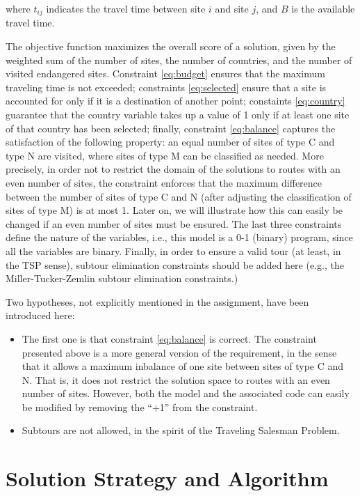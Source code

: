 \documentclass[12pt]{article}
\begin{document}
where $t_{ij}$ indicates the travel time between site $i$ and site $j$, and $B$
is the available travel time.

The objective function maximizes the overall score of a solution, given by the
weighted sum of the number of sites, the number of countries, and the number of
visited endangered sites. Constraint \eqref{eq:budget} ensures that the
maximum traveling time is not exceeded; constraints \eqref{eq:selected} ensure
that a site is accounted for only if it is a destination of another point;
constaints \eqref{eq:country} guarantee that the country variable takes up
a value of 1 only if at least one site of that country has been selected;
finally, constraint \eqref{eq:balance} captures the satisfaction of the following
property: an equal number of sites of type C and type N are visited, where
sites of type M can be classified as needed. More precisely, in order not to
restrict the domain of the solutions to routes with an even number of sites, the
constraint enforces that the maximum difference between the number of sites of
type C and N (after adjusting the classification of sites of type M) is at most
1. Later on, we will illustrate how this can easily be changed if an even
number of sites must be ensured. The last three constraints define the nature
of the variables, i.e., this model is a 0-1 (binary) program, since all the
variables are binary. Finally, in order to ensure a valid tour (at
least, in the TSP sense), subtour elimination constraints should be added here
(e.g., the Miller-Tucker-Zemlin subtour elimination constraints.)

Two hypotheses, not explicitly mentioned in the assignment, have been
introduced here:
\begin{itemize}
\item The first one is that constraint \eqref{eq:balance} is correct. The
constraint presented above is a more general version of the requirement, in the
sense that it allows a maximum inbalance of one site between sites of type C
and N. That is, it does not restrict the solution space to routes with an even
number of sites.  However, both the model and the associated code can easily be
modified by removing the ``+1'' from the constraint.
\item Subtours are not allowed, in the spirit of the Traveling Salesman
Problem.
\end{itemize}

\section{Solution Strategy and Algorithm}
\end{document}
